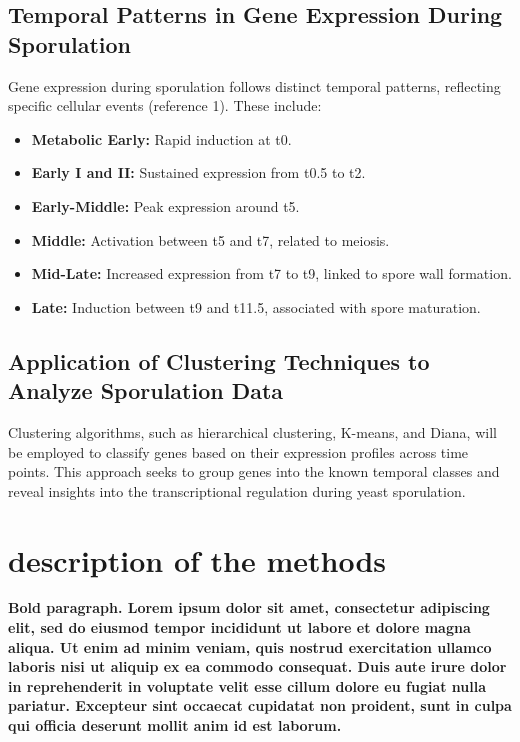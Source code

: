 \documentclass{llncs}
\begin{document}
\subsection*{Temporal Patterns in Gene Expression During Sporulation}

Gene expression during sporulation follows distinct temporal patterns, reflecting specific cellular events (reference 1). These include:
\begin{itemize}
	\item \textbf{Metabolic Early:} Rapid induction at t0.
	\item \textbf{Early I and II:} Sustained expression from t0.5 to t2.
	\item \textbf{Early-Middle:} Peak expression around t5.
	\item \textbf{Middle:} Activation between t5 and t7, related to meiosis.
	\item \textbf{Mid-Late:} Increased expression from t7 to t9, linked to spore wall formation.
	\item \textbf{Late:} Induction between t9 and t11.5, associated with spore maturation.
\end{itemize}

\subsection*{Application of Clustering Techniques to Analyze Sporulation Data}

Clustering algorithms, such as hierarchical clustering, K-means, and Diana, will be employed to classify genes based on their expression profiles across time points. This approach seeks to group genes into the known temporal classes and reveal insights into the transcriptional regulation during yeast sporulation.




\section{description of the methods}

\textbf{Bold paragraph. Lorem ipsum dolor sit amet, consectetur adipiscing elit, sed do eiusmod tempor incididunt ut labore et dolore magna aliqua. Ut enim ad minim veniam, quis nostrud exercitation ullamco laboris nisi ut aliquip ex ea commodo consequat. Duis aute irure dolor in reprehenderit in voluptate velit esse cillum dolore eu fugiat nulla pariatur. Excepteur sint occaecat cupidatat non proident, sunt in culpa qui officia deserunt mollit anim id est laborum.}
\end{document}
